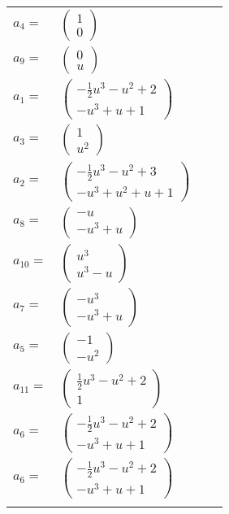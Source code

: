 \documentclass[1p]{elsarticle_modified}
\theoremstyle{definition}
\begin{document}
\begin{tabular}{m{7pt} m{180pt} m{7pt} m{180pt} }
\flushright $a_{4}=$&$\begin{pmatrix}1\\0\end{pmatrix}$ \\
\flushright $a_{9}=$&$\begin{pmatrix}0\\u\end{pmatrix}$ \\
\flushright $a_{1}=$&$\begin{pmatrix}-\frac{1}{2} u^3- u^2+2\\- u^3+u+1\end{pmatrix}$ \\
\flushright $a_{3}=$&$\begin{pmatrix}1\\u^2\end{pmatrix}$ \\
\flushright $a_{2}=$&$\begin{pmatrix}-\frac{1}{2} u^3- u^2+3\\- u^3+u^2+u+1\end{pmatrix}$ \\
\flushright $a_{8}=$&$\begin{pmatrix}- u\\- u^3+u\end{pmatrix}$ \\
\flushright $a_{10}=$&$\begin{pmatrix}u^3\\u^3- u\end{pmatrix}$ \\
\flushright $a_{7}=$&$\begin{pmatrix}- u^3\\- u^3+u\end{pmatrix}$ \\
\flushright $a_{5}=$&$\begin{pmatrix}-1\\- u^2\end{pmatrix}$ \\
\flushright $a_{11}=$&$\begin{pmatrix}\frac{1}{2} u^3- u^2+2\\1\end{pmatrix}$ \\
\flushright $a_{6}=$&$\begin{pmatrix}-\frac{1}{2} u^3- u^2+2\\- u^3+u+1\end{pmatrix}$\\ \flushright $a_{6}=$&$\begin{pmatrix}-\frac{1}{2} u^3- u^2+2\\- u^3+u+1\end{pmatrix}$\\&\end{tabular}
\end{document}
